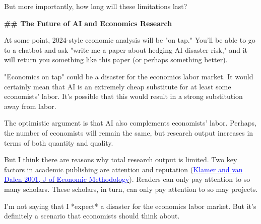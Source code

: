 \begin{mdframed}[linewidth=1pt, linecolor=black]
But more importantly, how long will these limitations last? 

\textbf{\textcolor{red!70!black}{\#\# The Future of AI and Economics Research}}

At some point, 2024-style economic analysis will be "on tap." You'll be able to go to a chatbot and ask "write me a paper about hedging AI disaster risk," and it will return you something like this paper (or perhaps something better). 

"Economics on tap" could be a disaster for the economics labor market. It would certainly mean that AI is an extremely cheap substitute for at least some economists' labor. It's possible that this would result in a strong substitution away from labor.

The optimistic argument is that AI also complements economists' labor. Perhaps, the number of economists will remain the same, but research output increases in terms of both quantity and quality. 

But I think there are reasons why total research output is limited. Two key factors in academic publishing are attention and reputation (\href{https://repub.eur.nl/pub/6875/2001-0221.pdf}{\textcolor{blue}{Klamer and van Dalen 2001, J of Economic Methodology}}). Readers can only pay attention to so many scholars. These scholars, in turn, can only pay attention to so may projects. 

I'm not saying that I *expect* a disaster for the economics labor market. But it's definitely a scenario that economists should think about. 
\endgroup
\end{mdframed}
\vspace{-3ex}